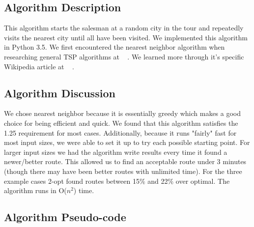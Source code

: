 \documentclass[../report/main.tex]{subfiles}
\begin{document}
\subsection*{Algorithm Description}

This algorithm starts the salesman at a random city in the tour and repeatedly visits the nearest city until all have been visited. We implemented this algorithm in Python 3.5.  We first encountered the nearest neighbor algorithm when researching general TSP algorithms at ~\cite{wikipediaTSP} . We learned more through it's specific Wikipedia article at ~\cite{wikipediaNN} .

\subsection*{Algorithm Discussion}

We chose nearest neighbor because it is essentially greedy which makes a good choice for being efficient and quick. We found that this algorithm satisfies the 1.25 requirement for most cases.  Additionally, because it runs "fairly" fast for most input sizes, we were able to set it up to try each possible starting point.  For larger input sizes we had the algorithm write results every time it found a newer/better route.  This allowed us to find an acceptable route under 3 minutes (though there may have been better routes with unlimited time).  For the three example cases 2-opt found routes between 15\% and 22\% over optimal.  The algorithm runs in O($n^2$) time.

\subsection*{Algorithm Pseudo-code}
\end{document}
